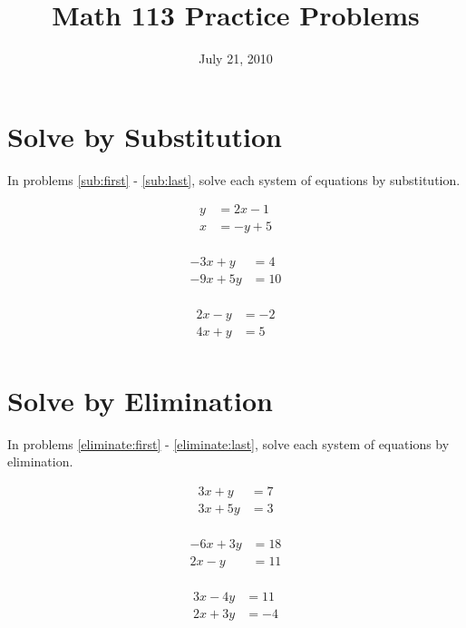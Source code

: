 \documentclass[fleqn,addpoints]{exam}
\title{Math 113 Practice Problems}
\author{}
\date{July 21, 2010}
\begin{document}
\maketitle

\section{Solve by Substitution}

In problems \ref{sub:first} - \ref{sub:last}, solve each system of equations by substitution.

\begin{questions}

\question 
\label{sub:first}
\begin{align*}
  y &= 2x-1 \\
  x &= -y + 5 \\
\end{align*}
\vspace{3 cm}

\question 
\begin{align*}
  -3x + y &= 4 \\
  -9x + 5y &= 10 \\
\end{align*}
\vspace{3 cm}

\question 
\label{sub:last}
\begin{align*}
  2x - y &= -2 \\
  4x + y &= 5 \\
\end{align*}
\vspace{3 cm}

\pagebreak

\section{Solve by Elimination}

In problems \ref{eliminate:first} - \ref{eliminate:last}, solve each system of equations by elimination.

\question 
\label{eliminate:first}
\begin{align*}
  3x + y &= 7 \\
  3x + 5y &= 3 \\
\end{align*}
\vspace{3 cm}

\question 
\begin{align*}
  -6x + 3y &= 18 \\
  2x - y &= 11 \\
\end{align*}
\vspace{3 cm}

\question 
\label{eliminate:last}
\begin{align*}
  3x - 4y &= 11 \\
  2x + 3y &= -4 \\
\end{align*}
\vspace{3 cm}

\end{questions}
\end{document}
